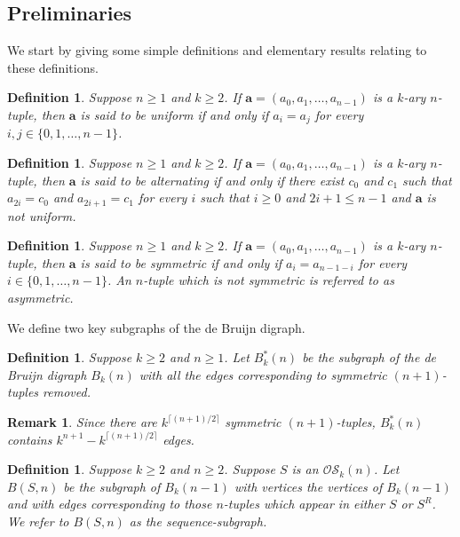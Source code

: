 \documentclass[a4paper,11pt]{article}
\newtheorem{definition}[lemma]{Definition}
\newtheorem{remark}[lemma]{Remark}
\begin{document}
\subsection{Preliminaries}  \label{subsection:preliminaries_for_bounds}

We start by giving some simple definitions and elementary results relating to these definitions.

\begin{definition}
Suppose $n\geq1$ and $k\geq2$.  If $\mathbf{a}=(a_0,a_1,\ldots,a_{n-1})$ is a $k$-ary $n$-tuple,
then $\mathbf{a}$ is said to be \emph{uniform} if and only if $a_i=a_j$ for every $i,j\in
\{0,1,\ldots,n-1\}$.
\end{definition}

\begin{definition}
Suppose $n\geq1$ and $k\geq2$.  If $\mathbf{a}=(a_0,a_1,\ldots,a_{n-1})$ is a $k$-ary $n$-tuple,
then $\mathbf{a}$ is said to be \emph{alternating} if and only if there exist $c_0$ and $c_1$ such
that $a_{2i}=c_0$ and $a_{2i+1}=c_1$ for every $i$ such that $i\ge0$ and $2i+1\le n-1$ and
$\mathbf{a}$ is not uniform.
\end{definition}

\begin{definition}
Suppose $n\geq1$ and $k\geq2$.  If $\mathbf{a}=(a_0,a_1,\ldots,a_{n-1})$ is a $k$-ary $n$-tuple,
then $\mathbf{a}$ is said to be \emph{symmetric} if and only if $a_i=a_{n-1-i}$ for every $i\in
\{0,1,\ldots,n-1\}$.  An $n$-tuple which is not symmetric is referred to as \emph{asymmetric}.
\end{definition}

We define two key subgraphs of the de Bruijn digraph.

\begin{definition}
Suppose $k\geq2$ and $n\geq1$.  Let $B_k^*(n)$ be the subgraph of the de Bruijn digraph $B_k(n)$
with all the edges corresponding to symmetric $(n+1)$-tuples removed.
\end{definition}

\begin{remark}  \label{remark:number_symmetric_tuples}
Since there are $k^{\lceil(n+1)/2\rceil}$ symmetric $(n+1)$-tuples, $B_k^*(n)$ contains
$k^{n+1}-k^{\lceil(n+1)/2\rceil}$ edges.
\end{remark}

\begin{definition}
Suppose $k\geq2$ and $n\geq2$.  Suppose $S$ is an $\mathcal{OS}_k(n)$.  Let $B(S,n)$ be the
subgraph of $B_k(n-1)$ with vertices the vertices of $B_k(n-1)$ and with edges corresponding to
those $n$-tuples which appear in either $S$ or $S^R$.  We refer to $B(S,n)$ as the
sequence-subgraph.
\end{definition}
\end{document}
